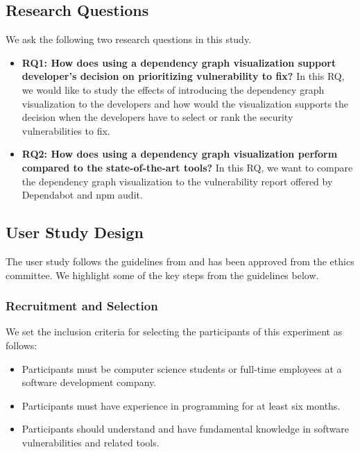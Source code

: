 \documentclass[conference]{IEEEtran}
\begin{document}
	\subsection{Research Questions}
	We ask the following two research questions in this study.
	
	\begin{itemize}
		\item \textbf{RQ1: How does using a dependency graph visualization support developer’s decision on prioritizing vulnerability to fix?} In this RQ, we would like to study the effects of introducing the dependency graph visualization to the developers and how would the visualization supports the decision when the developers have to select or rank the security vulnerabilities to fix.
		\item \textbf{RQ2: How does using a dependency graph visualization perform compared to the state-of-the-art tools?} In this RQ, we want to compare the dependency graph visualization to the vulnerability report offered by Dependabot and npm audit.
	\end{itemize}
	
	\subsection{User Study Design}
	The user study follows the guidelines from \citet{Ko2013} and has been approved from the ethics committee. We highlight some of the key steps from the guidelines below.
	
	\subsubsection{Recruitment and Selection}
	We set the inclusion criteria for selecting the participants of this experiment as follows:
	
	\begin{itemize}
		\item Participants must be computer science students or full-time employees at a software development company.
		\item Participants must have experience in programming for at least six months.
		\item Participants should understand and have fundamental knowledge in software vulnerabilities and related tools.
	\end{itemize}
	
\end{document}
